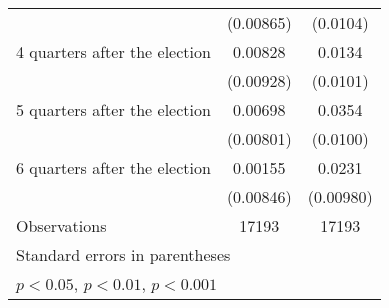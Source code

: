 \begin{table}[htbp]
\begin{tabular}{l*{2}{c}}
                    &   (0.00865)         &    (0.0104)         \\
[1em]
 4 quarters after the election&     0.00828         &      0.0134         \\
                    &   (0.00928)         &    (0.0101)         \\
[1em]
 5 quarters after the election&     0.00698         &      0.0354\sym{***}\\
                    &   (0.00801)         &    (0.0100)         \\
[1em]
 6 quarters after the election&     0.00155         &      0.0231\sym{*}  \\
                    &   (0.00846)         &   (0.00980)         \\
\hline
Observations        &       17193         &       17193         \\
\hline\hline
\multicolumn{3}{l}{\footnotesize Standard errors in parentheses}\\
\multicolumn{3}{l}{\footnotesize \sym{*} \(p<0.05\), \sym{**} \(p<0.01\), \sym{***} \(p<0.001\)}\\
\end{tabular}
\end{table}
